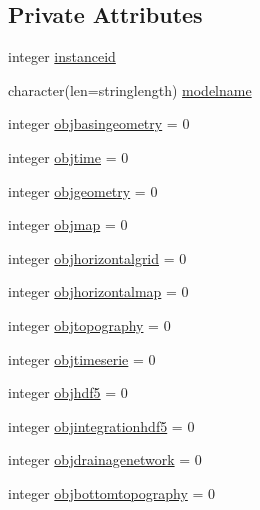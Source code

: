 \subsection*{Private Attributes}
\begin{DoxyCompactItemize}
\item 
integer \mbox{\hyperlink{structmoduleporousmedia_1_1t__porousmedia_aa325af5d6877638a53694fc01691389d}{instanceid}}
\item 
character(len=stringlength) \mbox{\hyperlink{structmoduleporousmedia_1_1t__porousmedia_a109a5eeef7006a61c7f6105794ba1a8f}{modelname}}
\item 
integer \mbox{\hyperlink{structmoduleporousmedia_1_1t__porousmedia_aef3e54293f5e17affc8ff3fd929fb69f}{objbasingeometry}} = 0
\item 
integer \mbox{\hyperlink{structmoduleporousmedia_1_1t__porousmedia_ab33dc57915d8be41fa42409b87376459}{objtime}} = 0
\item 
integer \mbox{\hyperlink{structmoduleporousmedia_1_1t__porousmedia_ab6baec21c23ac81855e937b437e5c301}{objgeometry}} = 0
\item 
integer \mbox{\hyperlink{structmoduleporousmedia_1_1t__porousmedia_a647b4b9a3accef026adfa64fa3aafd04}{objmap}} = 0
\item 
integer \mbox{\hyperlink{structmoduleporousmedia_1_1t__porousmedia_a86663e2a353eba83deb0bd03b1a105cc}{objhorizontalgrid}} = 0
\item 
integer \mbox{\hyperlink{structmoduleporousmedia_1_1t__porousmedia_a7c134aa6689fc32d8e4c865ff8bd8fa3}{objhorizontalmap}} = 0
\item 
integer \mbox{\hyperlink{structmoduleporousmedia_1_1t__porousmedia_afa997d253c31efa9edd4969457e0092e}{objtopography}} = 0
\item 
integer \mbox{\hyperlink{structmoduleporousmedia_1_1t__porousmedia_ac8e9885f333702bc2a7b8d825b169476}{objtimeserie}} = 0
\item 
integer \mbox{\hyperlink{structmoduleporousmedia_1_1t__porousmedia_a5d7399701f4c023f1edb99bccdaa2695}{objhdf5}} = 0
\item 
integer \mbox{\hyperlink{structmoduleporousmedia_1_1t__porousmedia_ada80089eb9c3b63380b4681e726b3e2e}{objintegrationhdf5}} = 0
\item 
integer \mbox{\hyperlink{structmoduleporousmedia_1_1t__porousmedia_a2b677e14da82f7f9b22b8ded70c136e2}{objdrainagenetwork}} = 0
\item 
integer \mbox{\hyperlink{structmoduleporousmedia_1_1t__porousmedia_ad318f0b83a6a9bca79a7484b8b01d396}{objbottomtopography}} = 0

\end{DoxyCompactItemize}
